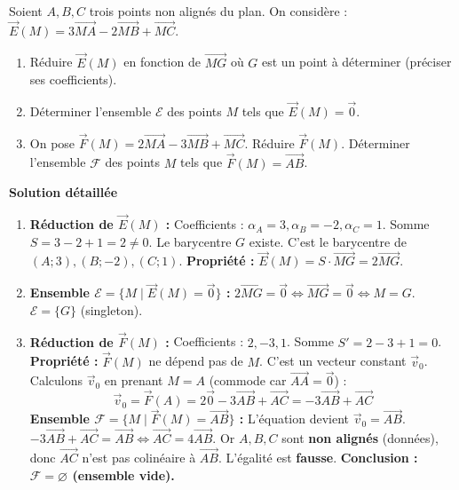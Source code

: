 \documentclass[11pt]{article}
\begin{document}
\begin{exoresolu}
Soient $A, B, C$ trois points non alignés du plan. On considère :
$\vec{E}(M) = 3\overrightarrow{MA} - 2\overrightarrow{MB} + \overrightarrow{MC}$.
\begin{enumerate}
    \item Réduire $\vec{E}(M)$ en fonction de $\overrightarrow{MG}$ où $G$ est un point à déterminer (préciser ses coefficients).
    \item Déterminer l'ensemble $\mathcal{E}$ des points $M$ tels que $\vec{E}(M) = \vec{0}$.
    \item On pose $\vec{F}(M) = 2\overrightarrow{MA} - 3\overrightarrow{MB} + \overrightarrow{MC}$. Réduire $\vec{F}(M)$. Déterminer l'ensemble $\mathcal{F}$ des points $M$ tels que $\vec{F}(M) = \overrightarrow{AB}$.
\end{enumerate}
\tcblower
\textbf{Solution détaillée}
\begin{enumerate}
    \item \textbf{Réduction de $\vec{E}(M)$ :}
    Coefficients : $\alpha_A = 3, \alpha_B = -2, \alpha_C = 1$.
    Somme $S = 3 - 2 + 1 = 2 \neq 0$.
    Le barycentre $G$ existe. C'est le barycentre de $(A;3), (B;-2), (C;1)$.
    \textbf{Propriété :} $\vec{E}(M) = S \cdot \overrightarrow{MG} = 2 \overrightarrow{MG}$.
    
    \item \textbf{Ensemble $\mathcal{E} = \{ M \mid \vec{E}(M) = \vec{0} \}$ :}
    $2 \overrightarrow{MG} = \vec{0} \iff \overrightarrow{MG} = \vec{0} \iff M = G$.
    $\mathcal{E} = \{ G \}$ (singleton).
    
    \item \textbf{Réduction de $\vec{F}(M)$ :}
    Coefficients : $2, -3, 1$. Somme $S' = 2 - 3 + 1 = 0$.
    \textbf{Propriété :} $\vec{F}(M)$ ne dépend pas de $M$. C'est un vecteur constant $\vec{v}_0$.
    Calculons $\vec{v}_0$ en prenant $M = A$ (commode car $\overrightarrow{AA}=\vec{0}$) :
    \[
    \vec{v}_0 = \vec{F}(A) = 2\vec{0} - 3\overrightarrow{AB} + \overrightarrow{AC} = -3\overrightarrow{AB} + \overrightarrow{AC}
    \]
    \textbf{Ensemble $\mathcal{F} = \{ M \mid \vec{F}(M) = \overrightarrow{AB} \}$ :}
    L'équation devient $\vec{v}_0 = \overrightarrow{AB}$.
    $-3\overrightarrow{AB} + \overrightarrow{AC} = \overrightarrow{AB} \iff \overrightarrow{AC} = 4\overrightarrow{AB}$.
    Or $A, B, C$ sont \textbf{non alignés} (données), donc $\overrightarrow{AC}$ n'est pas colinéaire à $\overrightarrow{AB}$.
    L'égalité est \textbf{fausse}.
    \textbf{Conclusion : $\mathcal{F} = \varnothing$ (ensemble vide).}
\end{enumerate}
\end{exoresolu}
\end{document}
